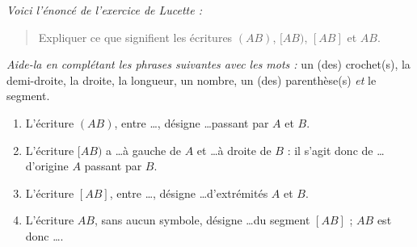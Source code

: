 \par{\em Voici l'énoncé de l'exercice de Lucette :}
\begin{quote}
  Expliquer ce que signifient les écritures $(AB)$, $[AB)$, $[AB]$ et $AB$.
\end{quote}
{\em Aide-la en complétant les phrases suivantes avec les mots : } un (des) crochet(s), la demi-droite, la droite, la longueur, un nombre, un (des) parenthèse(s) {\em et} le segment.
\begin{enumerate}[(1)]
\item L'écriture $(AB)$, entre \ldots, désigne \ldots passant par $A$ et $B$.
\item L'écriture $[AB)$ a \ldots à gauche de $A$ et \ldots à droite de $B$ : il s'agit donc de \ldots d'origine $A$ passant par $B$.
\item L'écriture $[AB]$, entre \ldots, désigne \ldots d'extrémités $A$ et $B$.
\item L'écriture $AB$, sans aucun symbole, désigne \ldots du segment $[AB]$ ; $AB$ est donc \ldots.
\end{enumerate}